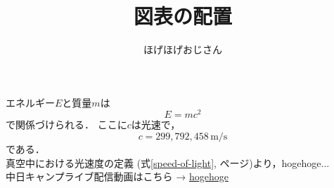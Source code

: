 \documentclass[a4paper, 11pt, uplatex]{jsarticle}
\begin{document}
\title{図表の配置}
\author{ほげほげおじさん}
\maketitle

エネルギー$E$と質量$m$は
\begin{equation} \label{speed-of-light}
	E = mc^{2}
\end{equation}
で関係づけられる．
ここに$c$は光速で，
\begin{equation}
	c = 299{,}792{,}458 \, \mathrm{m/s}
\end{equation}
である．
\\
真空中における光速度の定義 (式\ref{speed-of-light}, \pageref{speed-of-light}ページ)より，hogehoge...
\\
中日キャンプライブ配信動画はこちら → \href{https://www.youtube.com/watch?v=RO-eqtsu-yM&t=6706s}{hogehoge}
\end{document}
